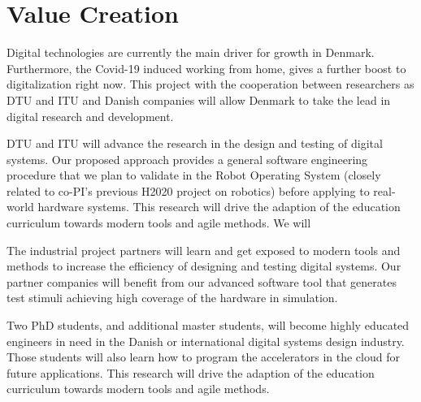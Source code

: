\documentclass[fleqn,12pt]{article}
\begin{document}
%


\section*{Value Creation}









Digital technologies are currently the main driver for growth in Denmark.
Furthermore, the Covid-19 induced working from home, gives a further boost to digitalization right now.
This project with the cooperation between researchers as DTU and ITU and
Danish companies will allow Denmark to take the lead in digital research and development.


DTU and ITU will advance the research in the design and testing of
digital systems. Our proposed approach provides a general software
engineering procedure that we plan to validate in the Robot Operating
System (closely related to co-PI's previous H2020 project on robotics) before
applying to real-world hardware systems.
This research will drive the adaption of the education curriculum towards modern tools and agile methods.
We will 



The industrial project partners will learn and get exposed to modern tools and methods to increase the efficiency of designing and testing digital systems. Our partner companies will benefit from our advanced software tool that generates test stimuli achieving high coverage of the hardware in simulation.


Two PhD students, and additional master students, will become highly educated engineers in need in the Danish or international digital systems design industry. Those students will also learn how to program the accelerators in the cloud for future applications. This research will drive the adaption of the education curriculum towards modern tools and agile methods.
\end{document}
